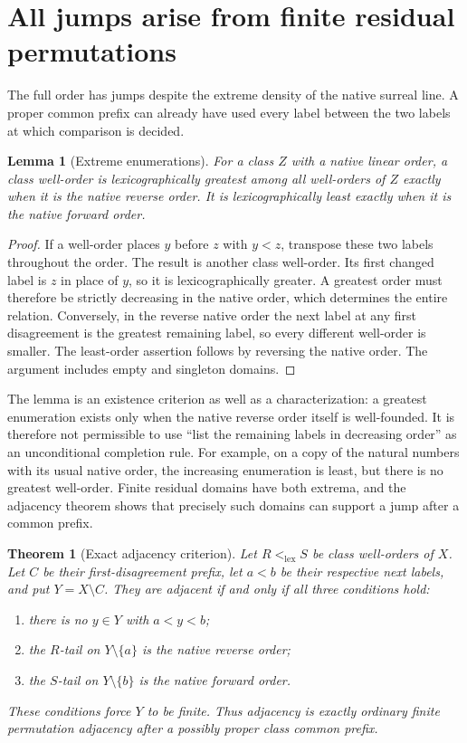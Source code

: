 \documentclass[11pt]{article}
\newtheorem{theorem}{Theorem}[section]
\newtheorem{lemma}[lemma]{Lemma}
\theoremstyle{definition}
\theoremstyle{remark}
\newcommand{\lex}{\mathrm{lex}}
\begin{document}
\section{All jumps arise from finite residual permutations}
\label{swo:cf:jumps}

The full order has jumps despite the extreme density of the native surreal
line.  A proper common prefix can already have used every label between the
two labels at which comparison is decided.

\begin{lemma}[Extreme enumerations]
\label{swo:cf:extreme}
For a class \(Z\) with a native linear order, a class well-order is
lexicographically greatest among all well-orders of \(Z\) exactly when
it is the native reverse order.  It is lexicographically least exactly
when it is the native forward order.
\end{lemma}

\begin{proof}
If a well-order places \(y\) before \(z\) with \(y<z\), transpose
these two labels throughout the order.  The result is another class
well-order.  Its first changed label is \(z\) in place of \(y\), so it
is lexicographically greater.  A greatest order must therefore be strictly
decreasing in the native order, which determines the entire relation.
Conversely, in the reverse native order the next label at any first
disagreement is the greatest remaining label, so every different
well-order is smaller.  The least-order assertion follows by reversing
the native order.  The argument includes empty and singleton domains.
\end{proof}

The lemma is an existence criterion as well as a characterization: a
greatest enumeration exists only when the native reverse order itself is
well-founded.  It is therefore not permissible to use ``list the remaining
labels in decreasing order'' as an unconditional completion rule.  For
example, on a copy of the natural numbers with its usual native order, the
increasing enumeration is least, but there is no greatest well-order.
Finite residual domains have both extrema, and the adjacency theorem shows
that precisely such domains can support a jump after a common prefix.

\begin{theorem}[Exact adjacency criterion]
\label{swo:cf:adjacency}
Let \(R<_{\lex}S\) be class well-orders of \(X\).  Let \(C\) be their
first-disagreement prefix, let \(a<b\) be their respective next labels,
and put \(Y=X\setminus C\).  They are adjacent if and only if all
three conditions hold:
\begin{enumerate}
  \item there is no \(y\in Y\) with \(a<y<b\);
  \item the \(R\)-tail on \(Y\setminus\{a\}\) is the native reverse
        order;
  \item the \(S\)-tail on \(Y\setminus\{b\}\) is the native forward
        order.
\end{enumerate}
These conditions force \(Y\) to be finite.  Thus adjacency is exactly
ordinary finite permutation adjacency after a possibly proper class
common prefix.
\end{theorem}
\end{document}
